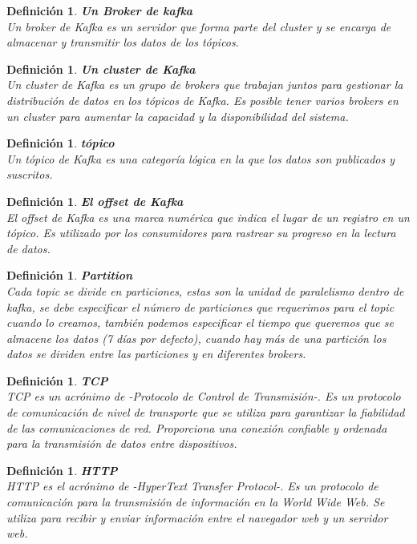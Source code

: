 \documentclass{article}
\newtheorem{defi}[propo]{Definición}
\begin{document}
\begin{defi}\textbf{Un Broker de kafka}\\
Un broker de Kafka es un servidor que forma parte del cluster y se encarga de almacenar y transmitir los datos de los tópicos.
\end{defi}

\begin{defi}\textbf{Un cluster de Kafka}\\
Un cluster de Kafka es un grupo de brokers que trabajan juntos para gestionar la distribución de datos en los tópicos de Kafka. Es posible tener varios brokers en un cluster para aumentar la capacidad y la disponibilidad del sistema.
\end{defi}

\begin{defi}\textbf{tópico}\\
Un tópico de Kafka es una categoría lógica en la que los datos son publicados y suscritos.
\end{defi}
\begin{defi}\textbf{El offset de Kafka}\\
El offset de Kafka es una marca numérica que indica el lugar de un registro en un tópico. Es utilizado por los consumidores para rastrear su progreso en la lectura de datos.

\end{defi}

\begin{defi}
    \textbf{Partition}\\
    Cada topic se divide en particiones, estas son la unidad de paralelismo dentro de kafka, se debe especificar el número de particiones que requerimos para el topic cuando lo creamos, también podemos especificar el tiempo que queremos que se almacene los datos (7 días por defecto), cuando hay más de una partición los datos se dividen entre las particiones y en diferentes brokers.
\end{defi}

\begin{defi}\textbf{TCP }\\
TCP es un acrónimo de -Protocolo de Control de Transmisión-. Es un protocolo de comunicación de nivel de transporte que se utiliza para garantizar la fiabilidad de las comunicaciones de red. Proporciona una conexión confiable y ordenada para la transmisión de datos entre dispositivos.
\end{defi}

\begin{defi}\textbf{HTTP}\\
HTTP es el acrónimo de -HyperText Transfer Protocol-. Es un protocolo de comunicación para la transmisión de información en la World Wide Web. Se utiliza para recibir y enviar información entre el navegador web y un servidor web.
\end{defi}
\end{document}
